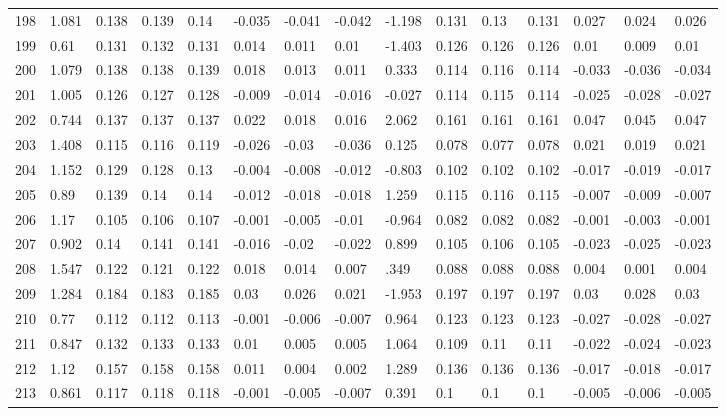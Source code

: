 \begin{table}
\begin{tabular}{|l|l|lll|lll|l|lll|lll}
		198 & 1.081 & 0.138 & 0.139 & 0.14 & -0.035 & -0.041 & -0.042 & -1.198 & 0.131 & 0.13 & 0.131 & 0.027 & 0.024 & 0.026 \\
		199 & 0.61 & 0.131 & 0.132 & 0.131 & 0.014 & 0.011 & 0.01 & -1.403 & 0.126 & 0.126 & 0.126 & 0.01 & 0.009 & 0.01 \\
		200 & 1.079 & 0.138 & 0.138 & 0.139 & 0.018 & 0.013 & 0.011 & 0.333 & 0.114 & 0.116 & 0.114 & -0.033 & -0.036 & -0.034 \\
		201 & 1.005 & 0.126 & 0.127 & 0.128 & -0.009 & -0.014 & -0.016 & -0.027 & 0.114 & 0.115 & 0.114 & -0.025 & -0.028 & -0.027 \\
		202 & 0.744 & 0.137 & 0.137 & 0.137 & 0.022 & 0.018 & 0.016 & 2.062 & 0.161 & 0.161 & 0.161 & 0.047 & 0.045 & 0.047 \\
		203 & 1.408 & 0.115 & 0.116 & 0.119 & -0.026 & -0.03 & -0.036 & 0.125 & 0.078 & 0.077 & 0.078 & 0.021 & 0.019 & 0.021 \\
		204 & 1.152 & 0.129 & 0.128 & 0.13 & -0.004 & -0.008 & -0.012 & -0.803 & 0.102 & 0.102 & 0.102 & -0.017 & -0.019 & -0.017 \\
		205 & 0.89 & 0.139 & 0.14 & 0.14 & -0.012 & -0.018 & -0.018 & 1.259 & 0.115 & 0.116 & 0.115 & -0.007 & -0.009 & -0.007 \\
		206 & 1.17 & 0.105 & 0.106 & 0.107 & -0.001 & -0.005 & -0.01 & -0.964 & 0.082 & 0.082 & 0.082 & -0.001 & -0.003 & -0.001 \\
		207 & 0.902 & 0.14 & 0.141 & 0.141 & -0.016 & -0.02 & -0.022 & 0.899 & 0.105 & 0.106 & 0.105 & -0.023 & -0.025 & -0.023 \\
		208 & 1.547 & 0.122 & 0.121 & 0.122 & 0.018 & 0.014 & 0.007 & .349 & 0.088 & 0.088 & 0.088 & 0.004 & 0.001 & 0.004 \\
		209 & 1.284 & 0.184 & 0.183 & 0.185 & 0.03 & 0.026 & 0.021 & -1.953 & 0.197 & 0.197 & 0.197 & 0.03 & 0.028 & 0.03 \\
		210 & 0.77 & 0.112 & 0.112 & 0.113 & -0.001 & -0.006 & -0.007 & 0.964 & 0.123 & 0.123 & 0.123 & -0.027 & -0.028 & -0.027 \\
		211 & 0.847 & 0.132 & 0.133 & 0.133 & 0.01 & 0.005 & 0.005 & 1.064 & 0.109 & 0.11 & 0.11 & -0.022 & -0.024 & -0.023 \\
		212 & 1.12 & 0.157 & 0.158 & 0.158 & 0.011 & 0.004 & 0.002 & 1.289 & 0.136 & 0.136 & 0.136 & -0.017 & -0.018 & -0.017 \\
		213 & 0.861 & 0.117 & 0.118 & 0.118 & -0.001 & -0.005 & -0.007 & 0.391 & 0.1 & 0.1 & 0.1 & -0.005 & -0.006 & -0.005 \\

\end{tabular}
\end{table}
